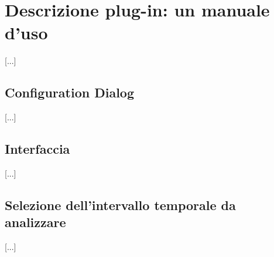 \chapter{Descrizione plug-in: un manuale d'uso}
\label{sec:plugindesc}
[...]\\



\section{Configuration Dialog}
\label{sec:confdlg}
	[...]\\
	
	

\section{Interfaccia}
\label{sec:MAAdlg}
	[...]\\
	


\section{Selezione dell'intervallo temporale da analizzare}
\label{sec:audioselection}
	[...]\\
	
	





